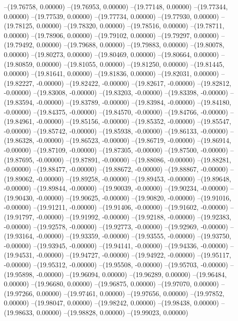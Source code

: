 --(19.76758, 0.00000)
--(19.76953, 0.00000)
--(19.77148, 0.00000)
--(19.77344, 0.00000)
--(19.77539, 0.00000)
--(19.77734, 0.00000)
--(19.77930, 0.00000)
--(19.78125, 0.00000)
--(19.78320, 0.00000)
--(19.78516, 0.00000)
--(19.78711, 0.00000)
--(19.78906, 0.00000)
--(19.79102, 0.00000)
--(19.79297, 0.00000)
--(19.79492, 0.00000)
--(19.79688, 0.00000)
--(19.79883, 0.00000)
--(19.80078, 0.00000)
--(19.80273, 0.00000)
--(19.80469, 0.00000)
--(19.80664, 0.00000)
--(19.80859, 0.00000)
--(19.81055, 0.00000)
--(19.81250, 0.00000)
--(19.81445, 0.00000)
--(19.81641, 0.00000)
--(19.81836, 0.00000)
--(19.82031, 0.00000)
--(19.82227, -0.00000)
--(19.82422, -0.00000)
--(19.82617, -0.00000)
--(19.82812, -0.00000)
--(19.83008, -0.00000)
--(19.83203, -0.00000)
--(19.83398, -0.00000)
--(19.83594, -0.00000)
--(19.83789, -0.00000)
--(19.83984, -0.00000)
--(19.84180, -0.00000)
--(19.84375, -0.00000)
--(19.84570, -0.00000)
--(19.84766, -0.00000)
--(19.84961, -0.00000)
--(19.85156, -0.00000)
--(19.85352, -0.00000)
--(19.85547, -0.00000)
--(19.85742, -0.00000)
--(19.85938, -0.00000)
--(19.86133, -0.00000)
--(19.86328, -0.00000)
--(19.86523, -0.00000)
--(19.86719, -0.00000)
--(19.86914, -0.00000)
--(19.87109, -0.00000)
--(19.87305, -0.00000)
--(19.87500, -0.00000)
--(19.87695, -0.00000)
--(19.87891, -0.00000)
--(19.88086, -0.00000)
--(19.88281, -0.00000)
--(19.88477, -0.00000)
--(19.88672, -0.00000)
--(19.88867, -0.00000)
--(19.89062, -0.00000)
--(19.89258, -0.00000)
--(19.89453, -0.00000)
--(19.89648, -0.00000)
--(19.89844, -0.00000)
--(19.90039, -0.00000)
--(19.90234, -0.00000)
--(19.90430, -0.00000)
--(19.90625, -0.00000)
--(19.90820, -0.00000)
--(19.91016, -0.00000)
--(19.91211, -0.00000)
--(19.91406, -0.00000)
--(19.91602, -0.00000)
--(19.91797, -0.00000)
--(19.91992, -0.00000)
--(19.92188, -0.00000)
--(19.92383, -0.00000)
--(19.92578, -0.00000)
--(19.92773, -0.00000)
--(19.92969, -0.00000)
--(19.93164, -0.00000)
--(19.93359, -0.00000)
--(19.93555, -0.00000)
--(19.93750, -0.00000)
--(19.93945, -0.00000)
--(19.94141, -0.00000)
--(19.94336, -0.00000)
--(19.94531, -0.00000)
--(19.94727, -0.00000)
--(19.94922, -0.00000)
--(19.95117, -0.00000)
--(19.95312, -0.00000)
--(19.95508, -0.00000)
--(19.95703, -0.00000)
--(19.95898, -0.00000)
--(19.96094, 0.00000)
--(19.96289, 0.00000)
--(19.96484, 0.00000)
--(19.96680, 0.00000)
--(19.96875, 0.00000)
--(19.97070, 0.00000)
--(19.97266, 0.00000)
--(19.97461, 0.00000)
--(19.97656, 0.00000)
--(19.97852, 0.00000)
--(19.98047, 0.00000)
--(19.98242, 0.00000)
--(19.98438, 0.00000)
--(19.98633, 0.00000)
--(19.98828, 0.00000)
--(19.99023, 0.00000)
